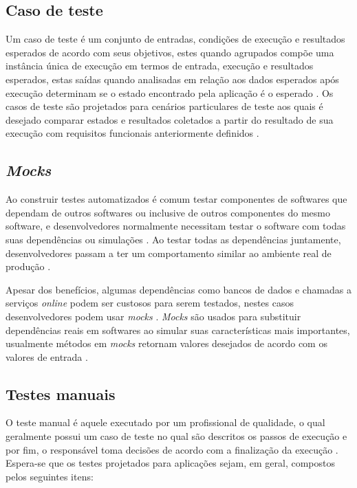 \documentclass[
	12pt,				%
	oneside,			%
	a4paper,			%
	english,			%
	brazil				%
	]{abntex2ppgsi}
\begin{document}
\subsection{Caso de teste}
Um caso de teste  é um conjunto de entradas, condições de execução e resultados esperados de acordo com seus objetivos, estes quando agrupados compõe uma instância única de execução em termos de entrada, execução e resultados esperados, estas saídas quando analisadas em relação aos dados esperados após execução determinam se o estado encontrado pela aplicação é o esperado \cite{Singh2014}. Os casos de teste são projetados para cenários particulares de teste aos quais é desejado comparar estados e resultados coletados a partir do resultado de sua execução com requisitos funcionais anteriormente definidos \cite{Jacob2016}.

\subsection{\textit{Mocks}}
Ao construir testes automatizados é comum testar componentes de softwares que dependam de outros softwares ou inclusive de outros componentes do mesmo software, e desenvolvedores  normalmente necessitam testar o software com todas suas dependências ou simulações \cite{Spadini2017}. Ao testar todas as dependências juntamente, desenvolvedores passam a ter um comportamento similar ao ambiente real de produção \cite{Spadini2017}.

Apesar dos benefícios, algumas dependências como bancos de dados e chamadas a serviços \textit{online} podem ser custosos para serem testados, nestes casos desenvolvedores podem usar \textit{mocks} \cite{Spadini2017}. \textit{Mocks} são usados para substituir dependências reais em softwares ao simular suas características mais importantes, usualmente métodos em \textit{mocks}  retornam valores desejados de acordo com os valores de entrada \cite{Spadini2017}. 

\subsection{Testes manuais}
O teste manual  é aquele executado por um profissional de qualidade, o qual geralmente possui um caso de teste no qual são descritos os passos de execução e por fim, o responsável toma decisões de acordo com a finalização da execução \cite{Kaprocki2015}. Espera-se que os testes projetados para aplicações sejam, em geral, compostos pelos seguintes itens:
\end{document}
